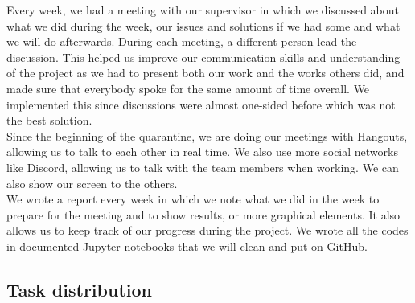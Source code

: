 Every week, we had a meeting with our supervisor in which we discussed about
what we did during the week, our issues and solutions if we had some and what
we will do afterwards. During each meeting, a different person lead the
discussion. This helped us improve our communication skills and understanding
of the project as we had to present both our work and the works others did, 
and made sure that everybody spoke for the same amount of time overall. 
We implemented this since
discussions were almost one-sided before which was not the best solution.\\
Since the beginning of the quarantine, we are doing our meetings with Hangouts,
allowing us to talk to each other in real time. We also use more social networks
like Discord, allowing us to talk with the team members when working. We can also
show our screen to the others. \\

We wrote a report every week in which we note what we did in
the week to prepare for the meeting and to show results, or more graphical
elements. It also allows us to keep track of our progress during the project.
We wrote all the codes in documented Jupyter notebooks that we will clean and put on GitHub. \\

\subsection{Task distribution}

